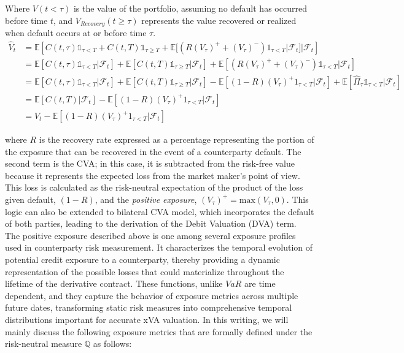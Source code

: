     Where $V(t < \tau)$ is the value of the portfolio, assuming no default has occurred before time $t$, and $V_{Recovery}(t \geq\tau)$ represents the value recovered or realized when default occurs at or before time $\tau$.
\noindent
    \begin{align*}
        \hat{V}_t &= \mathbb{E}\left[C(t, \tau)\mathbb{1}_{\tau<T} + C(t, T)\mathbb{1}_{\tau\geq T} + \mathbb{E}[(R(V_\tau)^+ + (V_\tau)^{-})1_{\tau<T}|\mathscr{F}_t]|\mathscr{F}_t\right] \\
         &= \mathbb{E}[C(t, \tau)\mathbb{1}_{\tau<T}|\mathscr{F}_t] + \mathbb{E}[C(t, T)\mathbb{1}_{\tau\geq T}|\mathscr{F}_t] + \mathbb{E}[(R(V_\tau)^+ + (V_\tau)^{-})\mathbb{1}_{\tau<T}|\mathscr{F}_t] \\
         &= \mathbb{E}[C(t, \tau)\mathbb{1}_{\tau<T}|\mathscr{F}_t] + \mathbb{E}[C(t, T)\mathbb{1}_{\tau\geq T}|\mathscr{F}_t] - \mathbb{E}[(1 - R)(V_\tau)^+1_{\tau<T}|\mathscr{F}_t] + \mathbb{E}[\hat{\Pi}_\tau \mathbb{1}_{\tau<T}|\mathscr{F}_t] \\
         &= \mathbb{E}[C(t, T)|\mathscr{F}_t] - \mathbb{E}[(1 - R)(V_\tau)^+1_{\tau<T}|\mathscr{F}_t] \\
         &= V_t - \mathbb{E}[(1 - R)(V_\tau)^+1_{\tau<T}|\mathscr{F}_t]
    \end{align*}
    

    where $R$ is the recovery rate expressed as a percentage representing the portion of the exposure that can be recovered in the event of a counterparty default. The second term is the CVA; in this case, it is subtracted from the risk-free value because it represents the expected loss from the market maker's point of view. This loss is calculated as the risk-neutral expectation of the product of the loss given default, $(1-R)$, and the \textit{positive exposure}, $(V_\tau)^+ = \text{max}(V_{\tau},0)$. This logic can also be extended to bilateral CVA model, which incorporates the default of both parties, leading to the derivation of the Debit Valuation (DVA) term.\\
    
\noindent
     The positive exposure described above is one among several exposure profiles used in counterparty risk measurement. It characterizes the temporal evolution of potential credit exposure to a counterparty, thereby providing a dynamic representation of the possible losses that could materialize throughout the lifetime of the derivative contract. These functions, unlike $VaR$ are time dependent, and they capture the behavior of exposure metrics across multiple future dates, transforming static risk measures into comprehensive temporal distributions important for accurate xVA valuation. In this writing, we will mainly discuss the following exposure metrics that are formally defined under the risk-neutral measure $\mathbb{Q}$ as follows:
    
